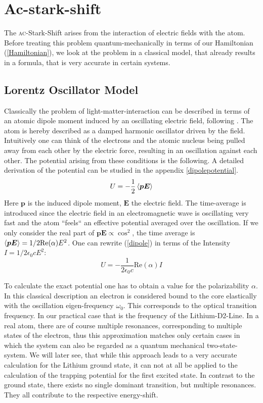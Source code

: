 \newpage
\newpage
\section{Ac-stark-shift}
The \textsc{ac}-Stark-Shift arises from the interaction of electric fields with the atom. Before treating this problem quantum-mechanically in terms of our Hamiltonian (\ref{Hamiltonian}), we look at the problem in a classical model, that already results in a formula, that is very accurate in certain systems. 
\subsection{Lorentz Oscillator Model}

 Classically the problem of light-matter-interaction can be described in terms of an atomic dipole moment induced by an oscillating electric field, following \cite{dipole}. The atom is hereby described as a damped harmonic oscillator driven by the field. Intuitively one can think of the electrons and the atomic nucleus being pulled away from each other by the electric force, resulting in an oscillation against each other. The potential arising from these conditions is the following. A detailed derivation of the potential can be studied in the appendix \ref{dipolepotential}.
\begin{equation}
U=-\frac{1}{2}\left\langle \boldsymbol{p E}\right\rangle
\label{dipole}
\end{equation} 
Here $\boldsymbol{p}$ is the induced dipole moment, $\boldsymbol{E}$ the electric field. The time-average is introduced since the electric field in an electromagnetic wave is oscillating very fast and the atom “feels“ an effective potential averaged over the oscillation. If we only consider the real part of $\boldsymbol{p}\boldsymbol{E}\propto \cos^2$, the time average is $\left\langle \boldsymbol{p}\boldsymbol{E}\right\rangle=1/2 \mathrm{ Re}(\alpha)E^2$. One can rewrite (\ref{dipole}) in terms of the Intensity $I=1/2\epsilon_0cE^2 $:
\begin{equation}
U=-\frac{1}{2\epsilon_0 c}\mathrm{Re}(\alpha)I
\end{equation} 

To calculate the exact potential one has to obtain a value for the polarizability $\alpha$. In this classical description an electron is considered bound to the core elastically with the oscillation eigen-frequency $\omega_0$. This corresponds to the optical transition frequency. In our practical case that is the frequency of the Lithium-D2-Line. In a real atom, there are of course multiple resonances, corresponding to multiple states of the electron, thus this approximation matches only  certain cases in which the system can also be regarded as a quantum mechanical two-state-system. We will later see, that while this approach leads to a very accurate calculation for the Lithium ground state, it can not at all be applied to the calculation of the trapping potential for the first excited state. In contrast to the ground state, there exists no single dominant transition, but multiple resonances. They all contribute to the respective energy-shift.

